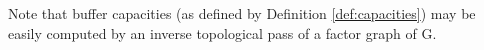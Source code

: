 

\begin{rem}
  Note that buffer capacities (as defined by Definition \ref{def:capacities}) may be easily computed by an inverse topological pass of a factor graph of G. 
\end{rem}


